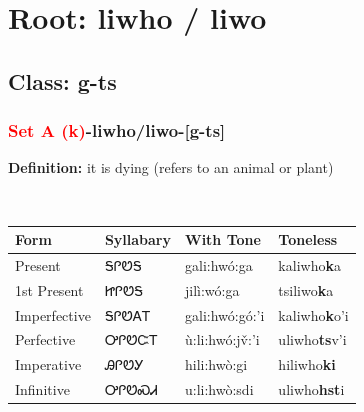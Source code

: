 \needspace{4in}
\section*{Root: liwho / liwo}
\nopagebreak
{}
\needspace{3in}
\subsection*{Class: g-ts}
\nopagebreak
\needspace{2in}
\subsubsection*{\textcolor{Red}{Set A (k)}{-}\textbf{liwho/liwo}{-}[g-ts]}
\nopagebreak
\textbf{Definition: } it is dying (refers to an animal or plant)
\\[0.5em]
\begin{tabularx}{\textwidth}{l X X X}%
\toprule%
\textbf{Form}&\textbf{Syllabary}&\textbf{With Tone}&\textbf{Toneless}\\%
\midrule%
Present&ᎦᎵᏬᎦ&gali:hwó:ga&kaliwho\textbf{k}a\\%
1st Present&ᏥᎵᏬᎦ&jilì:wó:ga&tsiliwo\textbf{k}a\\%
Imperfective&ᎦᎵᏬᎪᎢ&gali:hwó:gó:’i&kaliwho\textbf{k}o'i\\%
Perfective&ᎤᎵᏬᏨᎢ&ù:li:hwó:jv̌:’i&uliwho\textbf{ts}v'i\\%
Imperative&ᎯᎵᏬᎩ&hili:hwò:gi&hiliwho\textbf{ki}\\%
Infinitive&ᎤᎵᏬᏍᏗ&u:li:hwò:sdi&uliwho\textbf{hst}i\\%
\bottomrule%
\end{tabularx}
\\[1em]